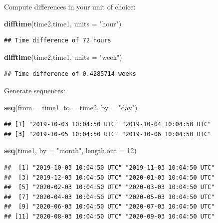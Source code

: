 \documentclass[]{book}
\newenvironment{Shaded}{\begin{snugshade}}{\end{snugshade}}
\newcommand{\DataTypeTok}[1]{\textcolor[rgb]{0.13,0.29,0.53}{#1}}
\newcommand{\DecValTok}[1]{\textcolor[rgb]{0.00,0.00,0.81}{#1}}
\newcommand{\KeywordTok}[1]{\textcolor[rgb]{0.13,0.29,0.53}{\textbf{#1}}}
\newcommand{\NormalTok}[1]{#1}
\newcommand{\StringTok}[1]{\textcolor[rgb]{0.31,0.60,0.02}{#1}}
\theoremstyle{definition}
\theoremstyle{definition}
\theoremstyle{definition}
\theoremstyle{remark}
\begin{document}
Compute differences in your unit of choice:

\begin{Shaded}
\begin{Highlighting}[]
\KeywordTok{difftime}\NormalTok{(time2,time1, }\DataTypeTok{units =}  \StringTok{"hour"}\NormalTok{)}
\end{Highlighting}
\end{Shaded}

\begin{verbatim}
## Time difference of 72 hours
\end{verbatim}

\begin{Shaded}
\begin{Highlighting}[]
\KeywordTok{difftime}\NormalTok{(time2,time1, }\DataTypeTok{units =}  \StringTok{"week"}\NormalTok{)}
\end{Highlighting}
\end{Shaded}

\begin{verbatim}
## Time difference of 0.4285714 weeks
\end{verbatim}

Generate sequences:

\begin{Shaded}
\begin{Highlighting}[]
\KeywordTok{seq}\NormalTok{(}\DataTypeTok{from =}\NormalTok{ time1, }\DataTypeTok{to =}\NormalTok{ time2, }\DataTypeTok{by =} \StringTok{"day"}\NormalTok{) }
\end{Highlighting}
\end{Shaded}

\begin{verbatim}
## [1] "2019-10-03 10:04:50 UTC" "2019-10-04 10:04:50 UTC"
## [3] "2019-10-05 10:04:50 UTC" "2019-10-06 10:04:50 UTC"
\end{verbatim}

\begin{Shaded}
\begin{Highlighting}[]
\KeywordTok{seq}\NormalTok{(time1, }\DataTypeTok{by =} \StringTok{"month"}\NormalTok{, }\DataTypeTok{length.out =} \DecValTok{12}\NormalTok{)}
\end{Highlighting}
\end{Shaded}

\begin{verbatim}
##  [1] "2019-10-03 10:04:50 UTC" "2019-11-03 10:04:50 UTC"
##  [3] "2019-12-03 10:04:50 UTC" "2020-01-03 10:04:50 UTC"
##  [5] "2020-02-03 10:04:50 UTC" "2020-03-03 10:04:50 UTC"
##  [7] "2020-04-03 10:04:50 UTC" "2020-05-03 10:04:50 UTC"
##  [9] "2020-06-03 10:04:50 UTC" "2020-07-03 10:04:50 UTC"
## [11] "2020-08-03 10:04:50 UTC" "2020-09-03 10:04:50 UTC"
\end{verbatim}
\end{document}
